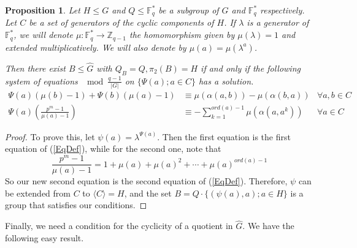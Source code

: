 \documentclass{article}
\newtheorem{proposition}[theorem]{Proposition}
\begin{document}
\begin{proposition} \label{EcuacionesG'}
    Let $H\leq G$ and $Q\leq \mathbb{F}_q^*$ be a subgroup of $G$ and $\mathbb{F}_q^*$ respectively. Let $C$ be a set of generators of the cyclic components of $H$. If $\lambda$ is a generator of $\mathbb{F}_q^*$, we will denote $\mu : \mathbb{F}_q^* \longrightarrow \mathbb{Z}_{q-1}$ the homomorphism given by $\mu(\lambda)=1$ and extended multiplicatively. We will also denote by $\mu(a) = \mu(\lambda ^a)$.
    
     Then there exist $B \leq \hat{G}$ with $Q_B=Q, \pi_2(B) = H$ if and only if the following system of equations $\mod \frac{q-1}{|G|} $ on $\{\Psi(a) ; a\in C \}$ has a solution.
    \begin{align} \label{SysEqDadoGrupoandCylic}
        \Psi(a) (\mu(b)-1) + \Psi(b) ( \mu(a) -1) & \equiv  \mu(\alpha(a,b)) - \mu(\alpha(b,a))  &  \forall a,b\in C \\
        \Psi(a) \left( \frac{p^m-1}{\mu(a) -1} \right) & \equiv - \sum _{k=1}^{ord(a)-1} \mu(\alpha(a,a^k)) & \forall a\in C 
    \end{align}
    
\end{proposition}

\begin{proof}
 To prove this, let $\psi(a) = \lambda^{\Psi(a)}$. Then the first equation is the first equation of (\ref{EqDef}), while for the second one, note that
 \begin{equation}
      \frac{p^m-1}{\mu(a) -1} = 1 + \mu(a) + \mu(a)^2 + \cdots + \mu(a)^{ord(a)-1}
 \end{equation}
 So our new second equation is the second equation of (\ref{EqDef}). Therefore, $\psi$ can be extended from $C$ to $\langle C \rangle = H$, and the set $B=Q\cdot \{(\psi(a),a) ; a\in H\} $ is a group that satisfies our conditions. 
\end{proof}


Finally, we need a condition for the cyclicity of a quotient in $\hat{G}$. We have the following easy result.
\end{document}

